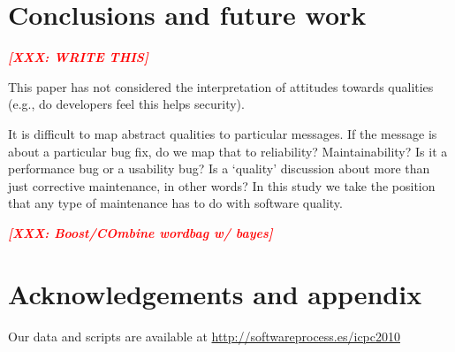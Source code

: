 \documentclass{acm_proc_article-sp}
\newcommand{\XXX}[1]{\textcolor{red}{{\it \textbf{[XXX: #1]}}}}
\begin{document}
\section{Conclusions and future work}

%

\XXX{WRITE THIS}


This paper has not considered the interpretation of attitudes towards qualities (e.g., do developers feel this helps security).

It is difficult to map abstract qualities to particular messages. If the message is about a particular bug fix, do we map that to reliability? Maintainability? Is it a performance bug or a usability bug? Is a `quality' discussion about more than just corrective maintenance, in other words? In this study we take the position that any type of maintenance has to do with software quality.

\XXX{Boost/COmbine wordbag w/ bayes}

\section{Acknowledgements and appendix}
Our data and scripts are available at \url{http://softwareprocess.es/icpc2010}



\end{document}
